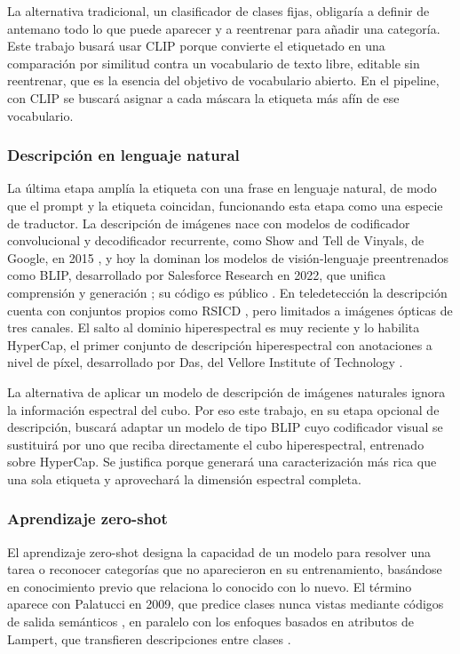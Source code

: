 \documentclass[12pt,onecolumn]{IEEEtran}
\begin{document}
La alternativa tradicional, un clasificador de clases fijas, obligaría a definir de antemano todo lo que puede aparecer y a reentrenar para añadir una categoría. Este trabajo busará usar CLIP porque convierte el etiquetado en una comparación por similitud contra un vocabulario de texto libre, editable sin reentrenar, que es la esencia del objetivo de vocabulario abierto. En el pipeline, con CLIP se buscará asignar a cada máscara la etiqueta más afín de ese vocabulario.

\subsubsection{Descripción en lenguaje natural}
La última etapa amplía la etiqueta con una frase en lenguaje natural, de modo que el prompt y la etiqueta coincidan, funcionando esta etapa como una especie de traductor. La descripción de imágenes nace con modelos de codificador convolucional y decodificador recurrente, como Show and Tell de Vinyals, de Google, en 2015 \cite{vinyals2015show}, y hoy la dominan los modelos de visión-lenguaje preentrenados como BLIP, desarrollado por Salesforce Research en 2022, que unifica comprensión y generación \cite{li2022blip}; su código es público \cite{salesforce2022blip_repo}. En teledetección la descripción cuenta con conjuntos propios como RSICD \cite{lu2017rsicd}, pero limitados a imágenes ópticas de tres canales. El salto al dominio hiperespectral es muy reciente y lo habilita HyperCap, el primer conjunto de descripción hiperespectral con anotaciones a nivel de píxel, desarrollado por Das, del Vellore Institute of Technology \cite{das2025hypercap}.

La alternativa de aplicar un modelo de descripción de imágenes naturales ignora la información espectral del cubo. Por eso este trabajo, en su etapa opcional de descripción, buscará adaptar un modelo de tipo BLIP cuyo codificador visual se sustituirá por uno que reciba directamente el cubo hiperespectral, entrenado sobre HyperCap. Se justifica porque generará una caracterización más rica que una sola etiqueta y aprovechará la dimensión espectral completa.

\subsubsection{Aprendizaje zero-shot}
El aprendizaje zero-shot designa la capacidad de un modelo para resolver una tarea o reconocer categorías que no aparecieron en su entrenamiento, basándose en conocimiento previo que relaciona lo conocido con lo nuevo. El término aparece con Palatucci en 2009, que predice clases nunca vistas mediante códigos de salida semánticos \cite{palatucci2009zeroshot}, en paralelo con los enfoques basados en atributos de Lampert, que transfieren descripciones entre clases \cite{lampert2009attribute}.
\end{document}
